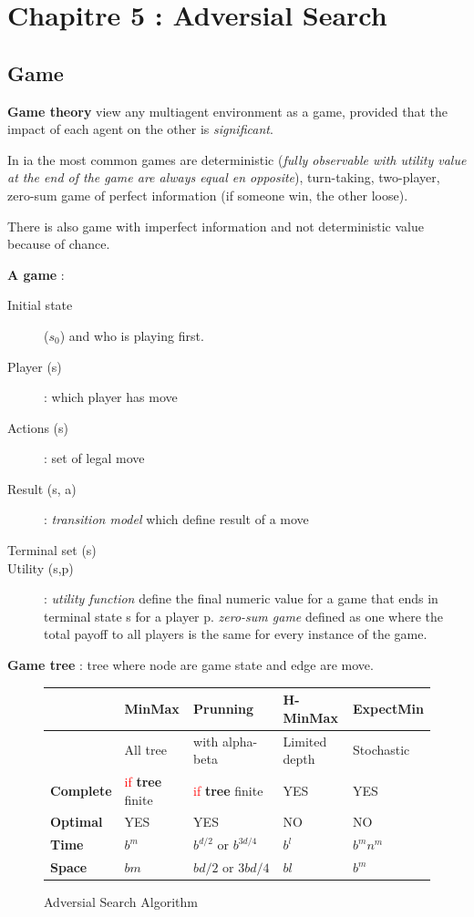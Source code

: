 \section{Chapitre 5 : Adversial Search}

\subsection{Game}

\textbf{Game theory} view any multiagent environment as a game, provided that
the impact of each agent on the other is \textit{significant}.

In ia the most common games are deterministic (\textit{fully observable with utility value at
the end of the game are always equal en opposite}), turn-taking, two-player, zero-sum game of
perfect information (if someone win, the other loose).

There is also game with imperfect information and not deterministic value because of chance.


\textbf{A game} :
\begin{description}
    \item[Initial state] ($s_0$) and who is playing first.
    \item[Player (s)] : which player has move
    \item[Actions (s)] : set of legal move
    \item[Result (s, a)] : \textit{transition model} which define result of a move
    \item[Terminal set (s)] 
    \item[Utility (s,p)] : \textit{utility function} define the final numeric value for a game that ends in terminal state s for a player p.
        \textit{zero-sum game} defined as one where the total payoff to all players is the same for every instance of the game.
\end{description}

\textbf{Game tree} : tree where node are game state and edge are move.

\begin{figure}[h]
\centering
\begin{tabular}{|l|m{3cm}|m{3cm}|m{3cm}|m{3cm}|}
\hline
& \textbf{MinMax} & \textbf{Prunning} & \textbf{H-MinMax} & \textbf{ExpectMin} \\
\hline
& All tree & with alpha-beta & Limited depth & Stochastic \\

\hline
\hline
\textbf{Complete} & \textcolor{red}{if} \textbf{tree} finite & \textcolor{red}{if} \textbf{tree} finite  & YES  & YES \\
\hline
\textbf{Optimal} & YES & YES & NO & NO \\
\hline
\textbf{Time} & $b^{m}$    & $b^{d/2}\textrm{ or }b^{3d/4}$ & $b^l$ & $b^m n^m$\\
\hline
\textbf{Space} & $bm$ & $bd/2\textrm{ or }3bd/4$ & $bl$ & $b^m$ \\
\hline

\end{tabular}
\caption{Adversial Search Algorithm}
\end{figure}



